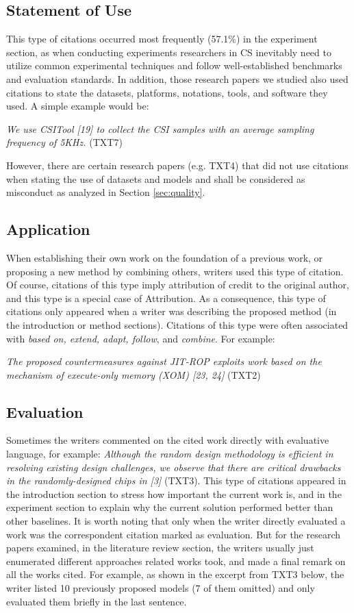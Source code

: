 \subsection{Statement of Use}
This type of citations occurred most frequently (57.1\%) in the experiment section, as when conducting experiments researchers in CS inevitably need to utilize common experimental techniques and follow well-established benchmarks and evaluation standards. In addition, those research papers we studied also used citations to state the datasets, platforms, notations, tools, and software they used. A simple example would be:

\textit{We use CSITool [19] to collect the CSI samples with an average sampling frequency of 5KHz.} (TXT7)

However, there are certain research papers (e.g. TXT4) that did not use citations when stating the use of datasets and models and shall be considered as misconduct as analyzed in Section \ref{sec:quality}.

\subsection{Application}
When establishing their own work on the foundation of a previous work, or proposing a new method by combining others, writers used this type of citation. Of course, citations of this type imply attribution of credit to the original author, and this type is a special case of Attribution. As a consequence, this type of citations only appeared when a writer was describing the proposed method (in the introduction or method sections). Citations of this type were often associated with \textit{based on, extend, adapt, follow}, and \textit{combine}. For example:

\textit{The proposed countermeasures against JIT-ROP exploits work based on the mechanism of execute-only memory (XOM) [23, 24]} (TXT2)

\subsection{Evaluation}
Sometimes the writers commented on the cited work directly with evaluative language, for example: \textit{Although the random design methodology is efficient in resolving existing design challenges, we observe that there are critical drawbacks in the randomly-designed chips in [3]} (TXT3). This type of citations appeared in the introduction section to stress how important the current work is, and in the experiment section to explain why the current solution performed better than other baselines. It is worth noting that only when the writer directly evaluated a work was the correspondent citation marked as evaluation. But for the research papers examined, in the literature review section, the writers usually just enumerated different approaches related works took, and made a final remark on all the works cited. For example, as shown in the excerpt from TXT3 below, the writer listed 10 previously proposed models (7 of them omitted) and only evaluated them briefly in the last sentence.


